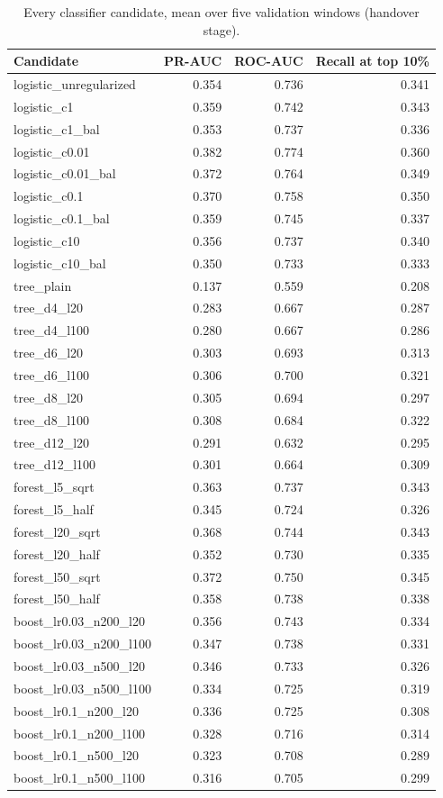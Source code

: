 \begin{table}[H]
\centering\small
\caption{Every classifier candidate, mean over five validation windows (handover stage).}
\label{tab:app-classifier}
\begin{tabular}{@{}lrrr@{}}
\toprule
Candidate & PR-AUC & ROC-AUC & Recall at top 10\% \\
\midrule
logistic\_unregularized & 0.354 & 0.736 & 0.341 \\
logistic\_c1 & 0.359 & 0.742 & 0.343 \\
logistic\_c1\_bal & 0.353 & 0.737 & 0.336 \\
logistic\_c0.01 & 0.382 & 0.774 & 0.360 \\
logistic\_c0.01\_bal & 0.372 & 0.764 & 0.349 \\
logistic\_c0.1 & 0.370 & 0.758 & 0.350 \\
logistic\_c0.1\_bal & 0.359 & 0.745 & 0.337 \\
logistic\_c10 & 0.356 & 0.737 & 0.340 \\
logistic\_c10\_bal & 0.350 & 0.733 & 0.333 \\
tree\_plain & 0.137 & 0.559 & 0.208 \\
tree\_d4\_l20 & 0.283 & 0.667 & 0.287 \\
tree\_d4\_l100 & 0.280 & 0.667 & 0.286 \\
tree\_d6\_l20 & 0.303 & 0.693 & 0.313 \\
tree\_d6\_l100 & 0.306 & 0.700 & 0.321 \\
tree\_d8\_l20 & 0.305 & 0.694 & 0.297 \\
tree\_d8\_l100 & 0.308 & 0.684 & 0.322 \\
tree\_d12\_l20 & 0.291 & 0.632 & 0.295 \\
tree\_d12\_l100 & 0.301 & 0.664 & 0.309 \\
forest\_l5\_sqrt & 0.363 & 0.737 & 0.343 \\
forest\_l5\_half & 0.345 & 0.724 & 0.326 \\
forest\_l20\_sqrt & 0.368 & 0.744 & 0.343 \\
forest\_l20\_half & 0.352 & 0.730 & 0.335 \\
forest\_l50\_sqrt & 0.372 & 0.750 & 0.345 \\
forest\_l50\_half & 0.358 & 0.738 & 0.338 \\
boost\_lr0.03\_n200\_l20 & 0.356 & 0.743 & 0.334 \\
boost\_lr0.03\_n200\_l100 & 0.347 & 0.738 & 0.331 \\
boost\_lr0.03\_n500\_l20 & 0.346 & 0.733 & 0.326 \\
boost\_lr0.03\_n500\_l100 & 0.334 & 0.725 & 0.319 \\
boost\_lr0.1\_n200\_l20 & 0.336 & 0.725 & 0.308 \\
boost\_lr0.1\_n200\_l100 & 0.328 & 0.716 & 0.314 \\
boost\_lr0.1\_n500\_l20 & 0.323 & 0.708 & 0.289 \\
boost\_lr0.1\_n500\_l100 & 0.316 & 0.705 & 0.299 \\
\bottomrule
\end{tabular}
\end{table}